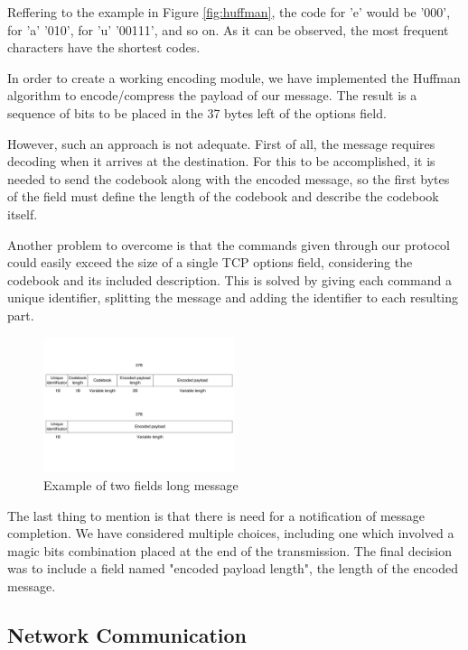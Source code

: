 Reffering to the example in Figure \ref{fig:huffman}, the code for 'e' would
be '000', for 'a' '010', for 'u' '00111', and so on. As it can be observed, the most
frequent characters have the shortest codes.

In order to create a working encoding module, we have implemented the Huffman
algorithm to encode/compress the payload of our message. The result is a
sequence of bits to be placed in the 37 bytes left of the options field.

However, such an approach is not adequate. First of all, the message requires decoding
when it arrives at the destination. For this to be accomplished, it is needed to
send the codebook along with the encoded message, so the first bytes of the
field must define the length of the codebook and describe the codebook itself.

Another problem to overcome is that the commands given through our protocol
could easily exceed the size of a single TCP options field, considering the
codebook and its included description. This is solved by giving each command
a unique identifier, splitting the message and adding the identifier to
each resulting part.

\begin{figure}
  \centering
  \includegraphics[width=0.5\textwidth]{img/encoded}
  \caption{Example of two fields long message}
  \label{fig:encoded}
\end{figure}

The last thing to mention is that there is need for a notification of message
completion. We have considered multiple choices, including
one which involved a magic bits combination placed at the end of the transmission.
The final decision was to include a field named "encoded payload length", the
length of the encoded message.

\subsection{Network Communication}
\label{sec:net-comm}

